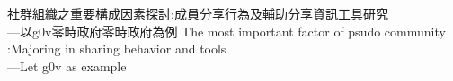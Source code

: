 
%



  \ChiMode %







%
%
%
%
%

\SetTitle %
{社群組織之重要構成因素探討:成員分享行為及輔助分享資訊工具研究 \\ ---以g0v零時政府零時政府為例} %
{The most important factor of psudo community :Majoring in sharing behavior and tools\\ ---Let g0v as example }



%
 \MasterDegree %

